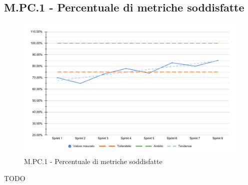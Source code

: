 \subsection{M.PC.1 - Percentuale di metriche soddisfatte}
\begin{figure}[H]
    \centering
    \includegraphics[width=\textwidth]{assets/metriche_soddisfatte.pdf}
    \caption{M.PC.1 - Percentuale di metriche soddisfatte}
\end{figure}

\par TODO